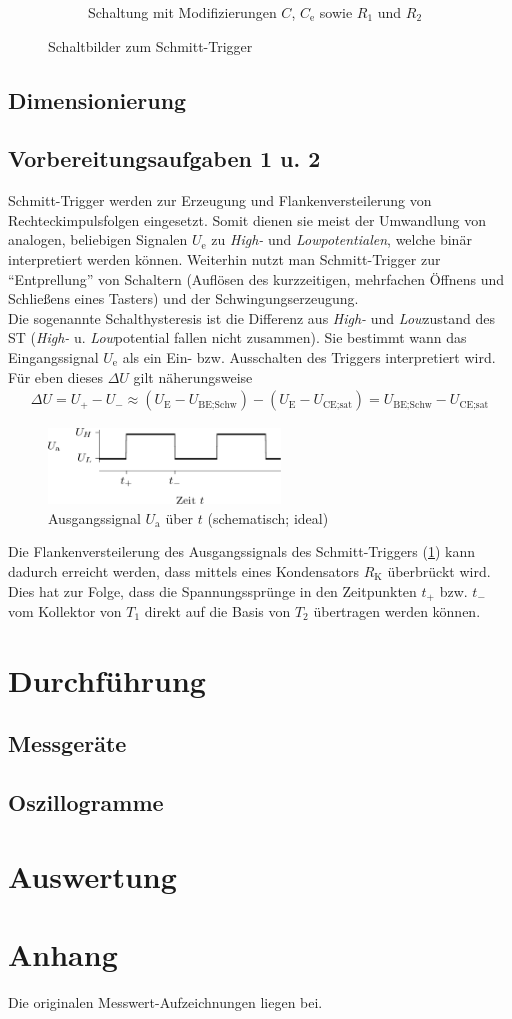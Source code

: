 \documentclass[numbers=noenddot,10pt,a4paper]{scrartcl}
\newcommand{\ix}[1]{_\text{#1}}
\begin{document}
\begin{figure}[H]
\begin{subfigure}[b]{0.49\textwidth}
\caption{Schaltung mit Modifizierungen $C$, $C\ix{e}$ sowie $R_1$ und $R_2$}
\end{subfigure}
\caption{Schaltbilder zum Schmitt-Trigger}
\end{figure}
\subsection{Dimensionierung}
\subsection{Vorbereitungsaufgaben 1 u. 2}
Schmitt-Trigger werden zur Erzeugung und Flankenversteilerung von Rechteckimpulsfolgen eingesetzt. Somit dienen sie meist der Umwandlung von analogen, beliebigen Signalen $U\ix{e}$ zu \textit{High-} und \textit{Lowpotentialen}, welche binär interpretiert werden können. Weiterhin nutzt man Schmitt-Trigger zur "`Entprellung"' von Schaltern (Auflösen des kurzzeitigen, mehrfachen Öffnens und Schließens eines Tasters) und der Schwingungserzeugung. \\
Die sogenannte Schalthysteresis ist die Differenz aus \textit{High-} und \textit{Low}zustand des ST (\textit{High-} u. \textit{Low}potential fallen nicht zusammen). Sie bestimmt wann das Eingangssignal $U\ix{e}$ als ein Ein- bzw. Ausschalten des Triggers interpretiert wird. Für eben dieses $\Delta U$ gilt näherungsweise
\begin{align}
\Delta U=U_+-U_-\approx\left(U\ix{E}-U\ix{BE;Schw}\right)-\left(U\ix{E}-U\ix{CE;sat}\right)=U\ix{BE;Schw}-U\ix{CE;sat}
\end{align}
\begin{figure}[H]
\centering
\includegraphics[width=0.55\textwidth]{ausgangssignal.png}
\caption{Ausgangssignal $U\ix{a}$ über $t$ (schematisch; ideal)}
\label{img:signal}
\end{figure}
Die Flankenversteilerung des Ausgangssignals des Schmitt-Triggers (\ref{img:signal}) kann dadurch erreicht werden, dass mittels eines Kondensators $R\ix{K}$ überbrückt wird. Dies hat zur Folge, dass die Spannungssprünge in den Zeitpunkten $t_+$ bzw. $t_-$ vom Kollektor von $T_1$ direkt auf die Basis von $T_2$ übertragen werden können.
\section{Durchführung}
\subsection{Messgeräte}
\subsection{Oszillogramme}
\section{Auswertung}
\section{Anhang}
Die originalen Messwert-Aufzeichnungen liegen bei.
\end{document}
